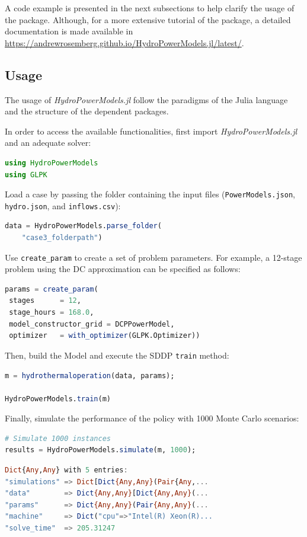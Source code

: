 \documentclass{juliacon}
\begin{document}
A code example is presented in the next subsections to help clarify the usage of the package. Although, for a more extensive tutorial of the package, a detailed documentation is made available in \url{https://andrewrosemberg.github.io/HydroPowerModels.jl/latest/}.

\subsection{Usage}
\label{subsub:usagehpm}
The usage of \textit{HydroPowerModels.jl} follow the paradigms of the Julia language and the structure of the dependent packages.

In order to access the available functionalities, first import \textit{HydroPowerModels.jl} and an adequate solver:

\begin{lstlisting}[language = Julia]
using HydroPowerModels
using GLPK
\end{lstlisting}

Load a case by passing the folder containing the input files (\texttt{PowerModels.json}, \texttt{hydro.json}, and \texttt{inflows.csv}):

\begin{lstlisting}[language = Julia]
data = HydroPowerModels.parse_folder(
    "case3_folderpath")
\end{lstlisting}

Use \texttt{create\_param} to create a set of problem parameters. For example, a 12-stage problem using the DC approximation can be specified as follows:
\begin{lstlisting}[language = Julia]
params = create_param( 
 stages      = 12, 
 stage_hours = 168.0,
 model_constructor_grid = DCPPowerModel,
 optimizer   = with_optimizer(GLPK.Optimizer))
\end{lstlisting}
    
Then, build the Model and execute the SDDP \texttt{train} method:

\begin{lstlisting}[language = Julia]
m = hydrothermaloperation(data, params);

HydroPowerModels.train(m)
\end{lstlisting}

Finally, simulate the performance of the policy with 1000 Monte Carlo scenarios:

\begin{lstlisting}[language = Julia]
# Simulate 1000 instances
results = HydroPowerModels.simulate(m, 1000);
\end{lstlisting}
\begin{lstlisting}[language = Julia]
 Dict{Any,Any} with 5 entries:
"simulations" => Dict[Dict{Any,Any}(Pair{Any,...
"data"        => Dict{Any,Any}[Dict{Any,Any}(...
"params"      => Dict{Any,Any}(Pair{Any,Any}(...
"machine"     => Dict("cpu"=>"Intel(R) Xeon(R)...
"solve_time"  => 205.31247
\end{lstlisting}
\end{document}
